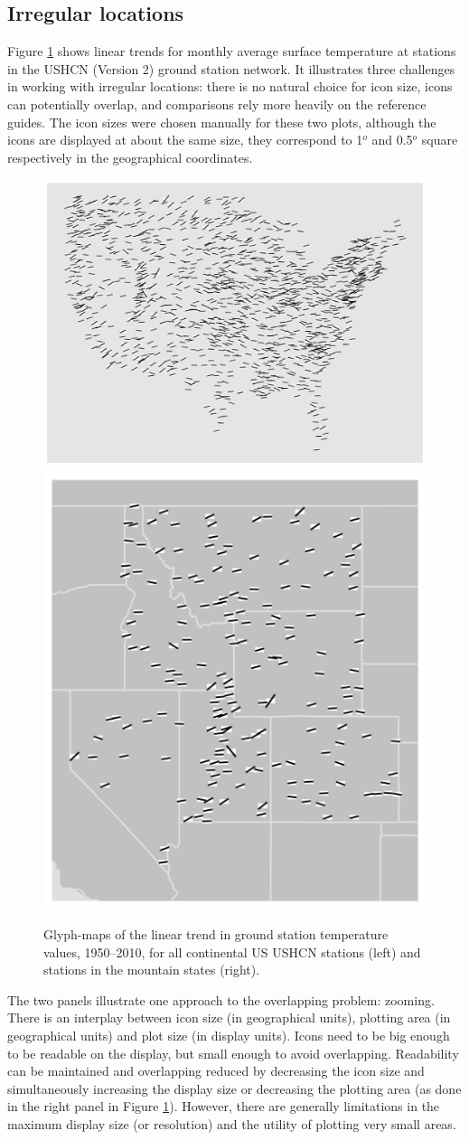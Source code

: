 \documentclass[oneside]{article}
\begin{document}
\subsection{Irregular locations}
Figure \ref{fig:irregular} shows linear trends for monthly average surface temperature at stations in the USHCN (Version 2) ground station network.  It illustrates three challenges in working with irregular locations: there is no natural choice for icon size, icons can potentially overlap, and comparisons rely more heavily on the reference guides.  The icon sizes were chosen manually for these two plots, although the icons are displayed at about the same size, they correspond to 1$^o$ and 0.5$^o$ square respectively in the geographical coordinates. 
\begin{figure}[htbp]
  \centering
  \includegraphics[width=0.55\linewidth]{usa-lin-overlap}%
  \includegraphics[width=0.35\linewidth]{ghcn-mountains}%
  \caption{Glyph-maps of the linear trend in ground station temperature values, 1950--2010, for all continental US USHCN stations (left) and stations in the mountain states (right).} 
  \label{fig:irregular}
\end{figure}
The two panels illustrate one approach to the overlapping problem: zooming.  There is an interplay between icon size (in geographical units), plotting area (in geographical units) and plot size (in display units).  Icons need to be big enough to be readable on the display, but small enough to avoid overlapping.  Readability can be maintained and overlapping reduced by decreasing the icon size and simultaneously increasing the display size or decreasing the plotting area (as done in the right panel in Figure \ref{fig:irregular}).  However, there are generally limitations in the maximum display size (or resolution) and the utility of plotting very small areas.  
\end{document}
